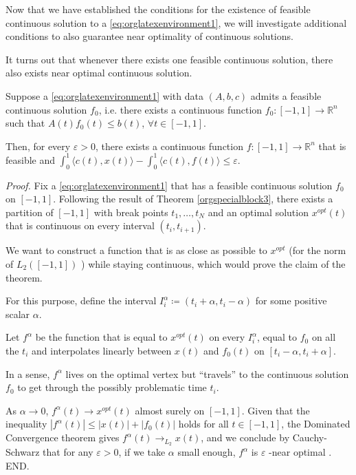 \documentclass[moor]{informs1}
\renewenvironment{proof}{\emph{Proof.}}{END.}
\begin{document}
Now that we have established the conditions for the existence of feasible continuous solution to a \ref{eq:orglatexenvironment1}, we will investigate additional conditions to also guarantee near optimality of continuous solutions.

It turns out that  whenever there exists one feasible continuous solution, there also exists near optimal continuous solution.

\begin{thm}
Suppose a \ref{eq:orglatexenvironment1} with data \((A, b, c)\) admits a feasible continuous solution \(f_0\), i.e. there exists a continuous function \(f_0: [-1, 1] \rightarrow \mathbb R^n\) such that \(A(t)f_0(t) \le b(t)\), \(\forall t \in [-1, 1]\).

Then, for every \(\varepsilon > 0\), there exists a continuous function \(f: [-1, 1] \rightarrow \mathbb R^n\) that is feasible and \(\int_0^1 \langle c(t), x(t)\rangle - \int_0^1 \langle c(t), f(t)\rangle \le \varepsilon\).
\label{orgspecialblock5}

\end{thm}

\begin{proof}
Fix a \ref{eq:orglatexenvironment1} that has a feasible continuous solution \(f_0\) on \([-1, 1]\).
Following the result of Theorem \ref{orgspecialblock3}, there exists  a partition  of \([-1, 1]\) with break points \(t_1, \ldots, t_N\) and an optimal solution \(x^{opt}(t)\) that is continuous on every interval \((t_i, t_{i+1})\).

We want to construct a function that is as close as possible to \(x^{opt}\) (for the norm of \(L_2([-1, 1])\) ) while staying continuous, which would prove the claim of the theorem.

For this purpose, define the interval \(I_i^{\alpha} \coloneqq (t_i+\alpha, t_i -\alpha)\) for some positive scalar \(\alpha\).

Let \(f^{\alpha}\) be the function that is equal to \(x^{opt}(t)\) on every \(I_i^{\alpha}\), equal to \(f_0\) on all the \(t_i\) and interpolates linearly between \(x(t)\) and \(f_0(t)\) on \([t_i-\alpha, t_i+\alpha]\).

In a sense, \(f^{\alpha}\) lives on the optimal vertex but ``travels'' to the continuous solution \(f_0\) to get through the possibly problematic time \(t_i\).

As \(\alpha \rightarrow 0\), \(f^{\alpha}(t) \rightarrow x^{opt}(t)\) almost surely on \([-1, 1]\). Given that the inequality \(|f^{\alpha}(t)| \le |x(t)| + |f_0(t)|\) holds for all \(t \in [-1, 1]\), the Dominated Convergence theorem gives \(f^{\alpha}(t) \rightarrow_{L_2} x(t)\), and we conclude by Cauchy-Schwarz that for any \(\varepsilon > 0\), if we take \(\alpha\) small enough, \(f^{\alpha}\) is \(\varepsilon\) -near optimal .
\end{proof}
\newpage
\end{document}
